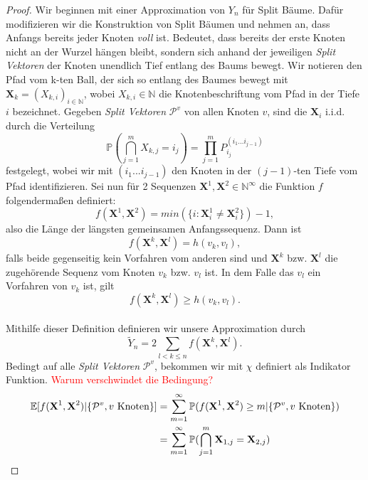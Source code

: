 \begin{proof}
  Wir beginnen mit einer Approximation von $Y_n$ für Split Bäume. Dafür modifizieren wir die Konstruktion von Split Bäumen und nehmen an, dass Anfangs bereits jeder Knoten \textit{voll} ist. Bedeutet, dass bereits der erste Knoten nicht an der Wurzel hängen bleibt, sondern sich anhand der jeweiligen \textit{Split Vektoren} der Knoten unendlich Tief entlang des Baums bewegt. Wir notieren den Pfad vom k-ten Ball, der sich so entlang des Baumes bewegt mit $\textbf{X}_k = (X_{k,i})_{i \in \mathbb{N}}$, wobei $X_{k,i} \in \mathbb{N}$ die Knotenbeschriftung vom Pfad in der  Tiefe $i$ bezeichnet. Gegeben \textit{Split Vektoren} $\mathcal{P}^{v}$ von allen Knoten $v$, sind die $\textbf{X}_i$ i.i.d. durch die Verteilung 
  \begin{equation}
    \label{independency sequence depth}
    \mathbb{P}(\bigcap_{j = 1}^{m}X_{k,j} = i_j) = \prod_{j=1}^{m}P_{i_j}^{(i_1...i_{j-1})}
  \end{equation}
  festgelegt, wobei wir mit $(i_1...i_{j-1})$ den Knoten in der $(j-1)$-ten Tiefe vom Pfad identifizieren. Sei nun für 2 Sequenzen $\textbf{X}^1,\textbf{X}^2 \in \mathbb{N}^{\infty}$ die Funktion $f$ folgendermaßen definiert:
  \[
    f(\textbf{X}^1,\textbf{X}^2) = min(\{i: \textbf{X}^1_i \neq \textbf{X}^2_i\}) - 1,
  \]
  also die Länge der längsten gemeinsamen Anfangssequenz. Dann ist 
  \[
    f(\textbf{X}^k,\textbf{X}^l) = h(v_k,v_l),
  \]
  falls beide gegenseitig kein Vorfahren vom anderen sind und $\textbf{X}^k$ bzw. $\textbf{X}^l$ die zugehörende Sequenz vom Knoten $v_k$ bzw. $v_l$ ist. In dem Falle das $v_l$ ein Vorfahren von $v_k$ ist, gilt 
  \begin{equation}
    \label{inequality for height}
    f(\textbf{X}^k,\textbf{X}^l) \geq h(v_k,v_l).
  \end{equation} \\
  Mithilfe dieser Definition definieren wir unsere Approximation durch 
  \[
    \tilde{Y}_n = 2\sum_{l < k \leq n}f(\textbf{X}^k,\textbf{X}^l).
  \]
Bedingt auf alle \textit{Split Vektoren} $\mathcal{P}^{v}$, bekommen wir mit $\chi$ definiert als Indikator Funktion. \textcolor{red}{Warum verschwindet die Bedingung?}
\begin{align}
\mathbb{E}[f(\textbf{X}^1,\textbf{X}^2)|\{\mathcal{P}^{v}, v \textnormal{ Knoten}\}] &=\sum_{m=1}^{\infty}\mathbb{P}({f(\textbf{X}^1,\textbf{X}^2) \geq m}|\{\mathcal{P}^{v}, v \textnormal{ Knoten}\}) \nonumber\\
&=\sum_{m=1}^{\infty}\mathbb{P}(\bigcap_{j=1}^{m}\textbf{X}_{1,j}=\textbf{X}_{2,j})   \nonumber\\

\end{align}
\end{proof}

